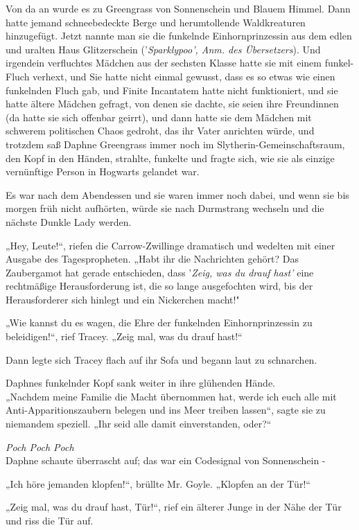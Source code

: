 {Von da an wurde es zu Greengrass von Sonnenschein und Blauem Himmel. Dann hatte jemand schneebedeckte Berge und herumtollende Waldkreaturen hinzugefügt. Jetzt nannte man sie die funkelnde Einhornprinzessin aus dem edlen und uralten Haus Glitzerschein ('\emph{Sparklypoo', Anm. des Übersetzers}). Und irgendein verfluchtes Mädchen aus der sechsten Klasse hatte sie mit einem funkel-Fluch verhext, und Sie hatte nicht einmal gewusst, dass es so etwas wie einen funkelnden Fluch gab, und Finite Incantatem hatte nicht funktioniert, und sie hatte ältere Mädchen gefragt, von denen sie dachte, sie seien ihre Freundinnen (da hatte sie sich offenbar geirrt), und dann hatte sie dem Mädchen mit schwerem politischen Chaos gedroht, das ihr Vater anrichten würde, und trotzdem saß Daphne Greengrass immer noch im Slytherin-Gemeinschaftsraum, den Kopf in den Händen, strahlte, funkelte und fragte sich, wie sie als einzige vernünftige Person in Hogwarts gelandet war.

Es war nach dem Abendessen und sie waren immer noch dabei, und wenn sie bis morgen früh nicht aufhörten, würde sie nach Durmstrang wechseln und die nächste Dunkle Lady werden.

„Hey, Leute!“, riefen die Carrow-Zwillinge dramatisch und wedelten mit einer Ausgabe des Tagespropheten. „Habt ihr die Nachrichten gehört? Das Zaubergamot hat gerade entschieden, dass '\emph{Zeig, was du drauf hast'} eine rechtmäßige Herausforderung ist, die so lange ausgefochten wird, bis der Herausforderer sich hinlegt und ein Nickerchen macht!"

„Wie kannst du es wagen, die Ehre der funkelnden Einhornprinzessin zu beleidigen!“, rief Tracey. „Zeig mal, was du drauf hast!“

Dann legte sich Tracey flach auf ihr Sofa und begann laut zu schnarchen.

Daphnes funkelnder Kopf sank weiter in ihre glühenden Hände.\\ „Nachdem meine Familie die Macht übernommen hat, werde ich euch alle mit Anti-Apparitionszaubern belegen und ins Meer treiben lassen“, sagte sie zu niemandem speziell. „Ihr seid alle damit einverstanden, oder?“

\emph{Poch Poch Poch}\\ Daphne schaute überrascht auf; das war ein Codesignal von Sonnenschein -

„Ich höre jemanden klopfen!“, brüllte Mr. Goyle. „Klopfen an der Tür!“

„Zeig mal, was du drauf hast, Tür!“, rief ein älterer Junge in der Nähe der Tür und riss die Tür auf.

}
